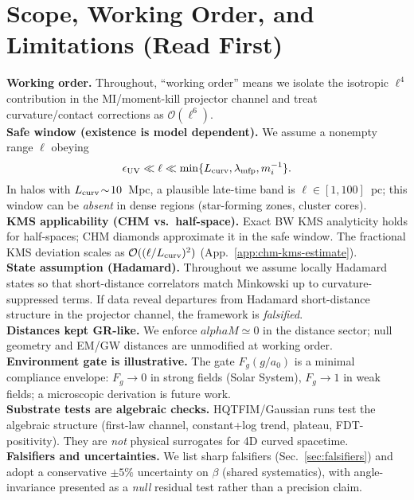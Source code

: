 \documentclass[aps,prd,onecolumn,superscriptaddress,nofootinbib]{revtex4-2}
\def\alphaM{alphaM}%
\def\alpha{alpha}%
\def\alpha_M{alphaM}%
\providecommand{\alphaM}{\alpha_M}
\begin{document}
\maketitle

\section{Scope, Working Order, and Limitations (Read First)}
\label{sec:scope}
\noindent\textbf{Working order.} Throughout, ``working order'' means we isolate the isotropic \(\ell^4\) contribution in the MI/moment-kill projector channel and treat curvature/contact corrections as \(\mathcal O(\ell^6)\).\\[3pt]
\noindent\textbf{Safe window (existence is model dependent).} We assume a nonempty range \(\ell\) obeying
\[
\epsilon_{\rm UV}\ll \ell \ll \min\{L_{\rm curv},\lambda_{\rm mfp},m_i^{-1}\}.
\]
In halos with \(L_{\rm curv}\!\sim\!10\)~Mpc, a plausible late-time band is \(\ell\in[1,100]\)~pc; this window can be \emph{absent} in dense regions (star-forming zones, cluster cores).\\[3pt]
\noindent\textbf{KMS applicability (CHM vs.\ half-space).} Exact BW KMS analyticity holds for half-spaces; CHM diamonds approximate it in the safe window. The fractional KMS deviation scales as \(\mathcal O((\ell/L_{\rm curv})^2)\) (App.~\ref{app:chm-kms-estimate}).\\[3pt]
\noindent\textbf{State assumption (Hadamard).} Throughout we assume locally Hadamard states so that short-distance correlators match Minkowski up to curvature-suppressed terms. If data reveal departures from Hadamard short-distance structure in the projector channel, the framework is \emph{falsified}.\\[3pt]
\noindent\textbf{Distances kept GR-like.} We enforce \(\alphaM\simeq 0\) in the distance sector; null geometry and EM/GW distances are unmodified at working order.\\[3pt]
\noindent\textbf{Environment gate is illustrative.} The gate \(F_g(g/a_0)\) is a minimal compliance envelope: \(F_g\!\to\!0\) in strong fields (Solar System), \(F_g\!\to\!1\) in weak fields; a microscopic derivation is future work.\\[3pt]
\noindent\textbf{Substrate tests are algebraic checks.} HQTFIM/Gaussian runs test the algebraic structure (first-law channel, constant+log trend, plateau, FDT-positivity). They are \emph{not} physical surrogates for 4D curved spacetime.\\[3pt]
\noindent\textbf{Falsifiers and uncertainties.} We list sharp falsifiers (Sec.~\ref{sec:falsifiers}) and adopt a conservative \(\pm 5\%\) uncertainty on \(\beta\) (shared systematics), with angle-invariance presented as a \emph{null} residual test rather than a precision claim.
\end{document}
